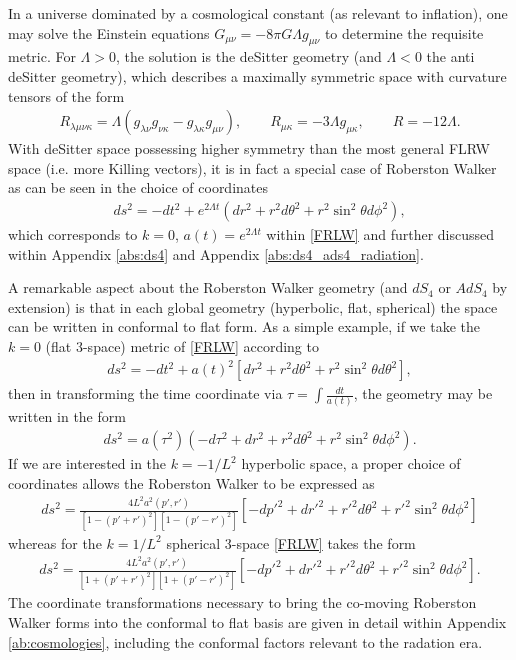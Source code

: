 In a universe dominated by a cosmological constant (as relevant to inflation), one may solve the Einstein equations $G_{\mu\nu} = -8\pi G \Lambda g_{\mu\nu}$ to determine the requisite metric. For $\Lambda > 0$, the solution is the deSitter geometry (and $\Lambda < 0$ the anti deSitter geometry), which describes a maximally symmetric space with curvature tensors of the form
\begin{eqnarray}
R_{\lambda\mu\nu\kappa} = \Lambda (g_{\lambda\nu}g_{\nu\kappa}-g_{\lambda\kappa}g_{\mu\nu}),
\qquad R_{\mu\kappa} = -3\Lambda g_{\mu\kappa},\qquad R=-12\Lambda.
\end{eqnarray} 
With deSitter space possessing higher symmetry than the most general FLRW space (i.e. more Killing vectors), it is in fact a special case of Roberston Walker as can be seen in the choice of coordinates 
\begin{eqnarray}
ds^2 = -dt^2 + e^{2\Lambda t} (dr^2 + r^2d\theta^2 + r^2\sin^2\theta d\phi^2),
\end{eqnarray}
which corresponds to $k=0$, $a(t) = e^{2\Lambda t}$ within \eqref{FRLW} and further discussed within Appendix \ref{abs:ds4} and Appendix \ref{abs:ds4_ads4_radiation}.

A remarkable aspect about the Roberston Walker geometry (and $dS_4$ or $AdS_4$ by extension) is that in each global geometry (hyperbolic, flat, spherical) the space can be written in conformal to flat form. As a simple example, if we take the $k=0$ (flat 3-space) metric of \eqref{FRLW} according to
\begin{eqnarray}
ds^2 = -dt^2 + a(t)^2\left[ dr^2 + r^2d\theta^2 + r^2\sin^2\theta d\theta^2\right],
\end{eqnarray}
then in transforming the time coordinate via $\tau = \int \frac{dt}{a(t)}$, the geometry may be written in the form
\begin{eqnarray}
ds^2 = a(\tau^2)( -d\tau^2 + dr^2 + r^2d\theta^2 + r^2\sin^2\theta d\phi^2). 
\end{eqnarray}
If we are interested in the $k=-1/L^2$ hyperbolic space, a proper choice of coordinates allows the Roberston Walker to be expressed as
\begin{eqnarray}
ds^2=\frac{4L^2 a^2(p',r')}{[1-(p'+r')^2][1-(p'-r')^2]} \left[ -dp'^2 + dr'^2+r'^2 d\theta^2 + r'^2 \sin^2\theta d\phi^2\right]
\end{eqnarray}
whereas for the $k=1/L^2$ spherical 3-space \eqref{FRLW} takes the form
\begin{eqnarray}
ds^2=\frac{4L^2 a^2(p',r')}{[1+(p'+r')^2][1+(p'-r')^2]} \left[ -dp'^2 + dr'^2+r'^2 d\theta^2 + r'^2 \sin^2\theta d\phi^2\right].
\end{eqnarray}
The coordinate transformations necessary to bring the co-moving Roberston Walker forms into the conformal to flat basis are given in detail within Appendix \ref{ab:cosmologies}, including the conformal factors relevant to the radation era.

